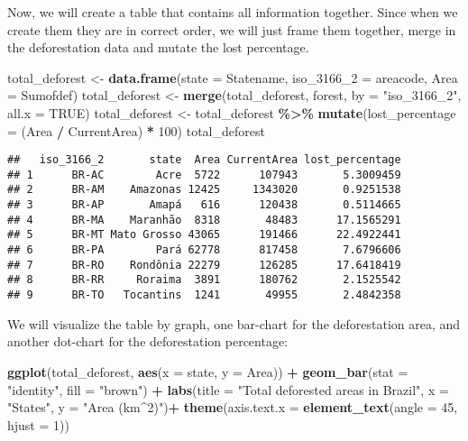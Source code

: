 \documentclass[
]{article}
\newenvironment{Shaded}{\begin{snugshade}}{\end{snugshade}}
\newcommand{\AttributeTok}[1]{\textcolor[rgb]{0.13,0.29,0.53}{#1}}
\newcommand{\ConstantTok}[1]{\textcolor[rgb]{0.56,0.35,0.01}{#1}}
\newcommand{\DecValTok}[1]{\textcolor[rgb]{0.00,0.00,0.81}{#1}}
\newcommand{\FunctionTok}[1]{\textcolor[rgb]{0.13,0.29,0.53}{\textbf{#1}}}
\newcommand{\NormalTok}[1]{#1}
\newcommand{\OtherTok}[1]{\textcolor[rgb]{0.56,0.35,0.01}{#1}}
\newcommand{\SpecialCharTok}[1]{\textcolor[rgb]{0.81,0.36,0.00}{\textbf{#1}}}
\newcommand{\StringTok}[1]{\textcolor[rgb]{0.31,0.60,0.02}{#1}}
\begin{document}
Now, we will create a table that contains all information together.
Since when we create them they are in correct order, we will just frame
them together, merge in the deforestation data and mutate the lost
percentage.

\begin{Shaded}
\begin{Highlighting}[]
\NormalTok{total\_deforest }\OtherTok{\textless{}{-}} \FunctionTok{data.frame}\NormalTok{(}\AttributeTok{state =}\NormalTok{ Statename, }\AttributeTok{iso\_3166\_2 =}\NormalTok{ areacode,}
                   \AttributeTok{Area =}\NormalTok{ Sumofdef)}
\NormalTok{total\_deforest }\OtherTok{\textless{}{-}} \FunctionTok{merge}\NormalTok{(total\_deforest, forest, }\AttributeTok{by =} \StringTok{"iso\_3166\_2"}\NormalTok{, }\AttributeTok{all.x =} \ConstantTok{TRUE}\NormalTok{)}
\NormalTok{total\_deforest  }\OtherTok{\textless{}{-}}\NormalTok{ total\_deforest }\SpecialCharTok{\%\textgreater{}\%}
  \FunctionTok{mutate}\NormalTok{(}\AttributeTok{lost\_percentage =}\NormalTok{ (Area }\SpecialCharTok{/}\NormalTok{ CurrentArea) }\SpecialCharTok{*} \DecValTok{100}\NormalTok{)}
\NormalTok{total\_deforest}
\end{Highlighting}
\end{Shaded}

\begin{verbatim}
##   iso_3166_2       state  Area CurrentArea lost_percentage
## 1      BR-AC        Acre  5722      107943       5.3009459
## 2      BR-AM    Amazonas 12425     1343020       0.9251538
## 3      BR-AP       Amapá   616      120438       0.5114665
## 4      BR-MA    Maranhão  8318       48483      17.1565291
## 5      BR-MT Mato Grosso 43065      191466      22.4922441
## 6      BR-PA        Pará 62778      817458       7.6796606
## 7      BR-RO    Rondônia 22279      126285      17.6418419
## 8      BR-RR     Roraima  3891      180762       2.1525542
## 9      BR-TO   Tocantins  1241       49955       2.4842358
\end{verbatim}

We will visualize the table by graph, one bar-chart for the
deforestation area, and another dot-chart for the deforestation
percentage:

\begin{Shaded}
\begin{Highlighting}[]
\FunctionTok{ggplot}\NormalTok{(total\_deforest, }\FunctionTok{aes}\NormalTok{(}\AttributeTok{x =}\NormalTok{ state, }\AttributeTok{y =}\NormalTok{ Area)) }\SpecialCharTok{+}
  \FunctionTok{geom\_bar}\NormalTok{(}\AttributeTok{stat =} \StringTok{"identity"}\NormalTok{, }\AttributeTok{fill =} \StringTok{"brown"}\NormalTok{) }\SpecialCharTok{+}
  \FunctionTok{labs}\NormalTok{(}\AttributeTok{title =} \StringTok{"Total deforested areas in Brazil"}\NormalTok{, }\AttributeTok{x =} \StringTok{"States"}\NormalTok{, }\AttributeTok{y =} \StringTok{"Area (km\^{}2)"}\NormalTok{)}\SpecialCharTok{+}
  \FunctionTok{theme}\NormalTok{(}\AttributeTok{axis.text.x =} \FunctionTok{element\_text}\NormalTok{(}\AttributeTok{angle =} \DecValTok{45}\NormalTok{, }\AttributeTok{hjust =} \DecValTok{1}\NormalTok{))}
\end{Highlighting}
\end{Shaded}
\end{document}

